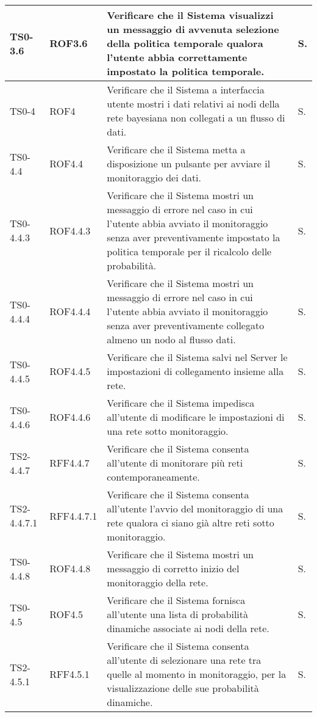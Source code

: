 \begin{longtable}{|C{.15\textwidth}|C{.14\textwidth}|m{.52\textwidth}|m{.08\textwidth}|}
\hline
TS0-3.6 & ROF3.6 & Verificare che il Sistema visualizzi un messaggio di avvenuta selezione della politica temporale qualora l'utente abbia correttamente impostato la politica temporale. & S. \\
\hline
{}TS0-4 & ROF4 & Verificare che il Sistema a interfaccia utente mostri i dati relativi ai nodi della rete bayesiana non collegati a un flusso di dati. & S. \\
\hline
TS0-4.4 & ROF4.4 & Verificare che il Sistema metta a disposizione un pulsante per avviare il monitoraggio dei dati. & S. \\
\hline
{}TS0-4.4.3 & ROF4.4.3 & Verificare che il Sistema mostri un messaggio di errore nel caso in cui l'utente abbia avviato il monitoraggio senza aver preventivamente impostato la politica temporale per il ricalcolo delle probabilità. & S. \\
\hline
TS0-4.4.4 & ROF4.4.4 & Verificare che il Sistema mostri un messaggio di errore nel caso in cui l'utente abbia avviato il monitoraggio senza aver preventivamente  collegato almeno un nodo al flusso dati. & S. \\
\hline
{}TS0-4.4.5 & ROF4.4.5 & Verificare che il Sistema salvi nel Server le impostazioni di collegamento insieme alla rete. & S. \\
\hline
TS0-4.4.6 & ROF4.4.6 & Verificare che il Sistema impedisca all'utente di modificare le impostazioni di una rete sotto monitoraggio. & S. \\
\hline
{}TS2-4.4.7 & RFF4.4.7 & Verificare che il Sistema consenta all'utente di monitorare più reti contemporaneamente. & S. \\
\hline
TS2-4.4.7.1 & RFF4.4.7.1 & Verificare che il Sistema consenta all'utente l'avvio del monitoraggio di una rete qualora ci siano già altre reti sotto monitoraggio. & S. \\
\hline
{}TS0-4.4.8 & ROF4.4.8 & Verificare che il Sistema mostri un messaggio di corretto inizio del monitoraggio della rete. & S. \\
\hline
TS0-4.5 & ROF4.5 & Verificare che il Sistema fornisca all'utente una lista di probabilità dinamiche associate ai nodi della rete. & S. \\
\hline
{}TS2-4.5.1 & RFF4.5.1 & Verificare che il Sistema consenta all'utente di selezionare una rete tra quelle al momento in monitoraggio, per la visualizzazione delle sue probabilità dinamiche. & S. \\

\end{longtable}
